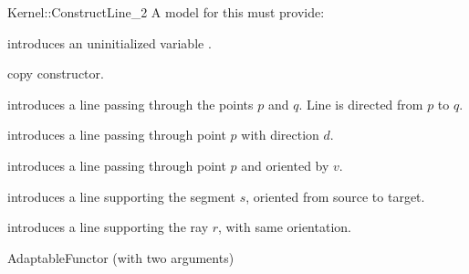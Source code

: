 \begin{ccRefFunctionObjectConcept}{Kernel::ConstructLine_2}
A model for this must provide:


\ccHidden {}
             {introduces an uninitialized variable .}

\ccHidden {}
            {copy constructor.}

            {introduces a line  passing through the points $p$ and $q$. 
             Line  is directed from $p$ to $q$.}

            {introduces a line  passing through point $p$ with 
             direction $d$.}

            {introduces a line  passing through point $p$ and
             oriented by $v$.}

            {introduces a line  supporting the segment $s$,
            oriented from source to target.}

            {introduces a line  supporting the ray $r$,
            with same orientation.}

\ccRefines
AdaptableFunctor (with two arguments)

\ccSeeAlso
{}  \\

\end{ccRefFunctionObjectConcept}
